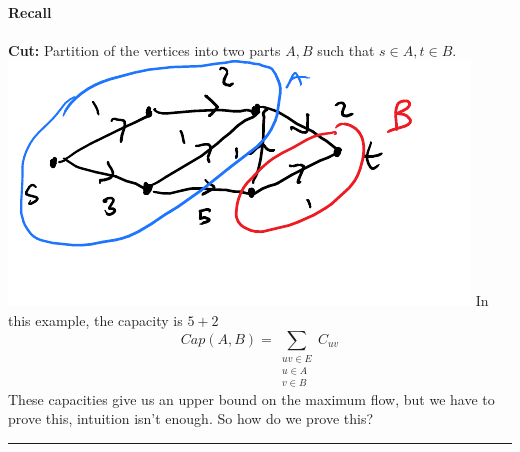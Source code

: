 \documentclass[12 pt]{article}
\begin{document}
        \paragraph{Recall} \textbf{Cut:} Partition of the vertices
        into two parts $A,B$ such that $s\in A, t \in B$.
        \\ \includegraphics[width=.7\textwidth]{i22.pdf}
        In this example, the capacity is $5+2$
        $$Cap(A,B) = \sum_{\substack{uv \in E \\ u \in A \\ v \in B}}
        C_{uv}$$
        These capacities give us an upper bound on the maximum flow,
        but we have to prove this, intuition isn't enough. So how do
        we prove this?
        \\ \rule{\textwidth}{0.5 pt}
\end{document}
